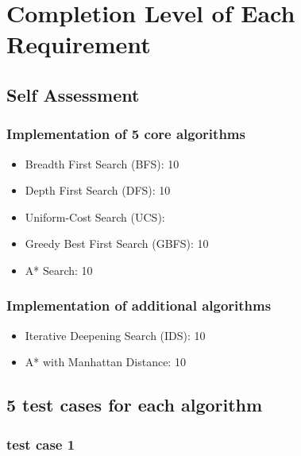 \section{Completion Level of Each Requirement}
\subsection{Self Assessment}
\subsubsection{Implementation of 5 core algorithms}
\begin{itemize}
    \item Breadth First Search (BFS): 10
    \item Depth First Search (DFS): 10
    \item Uniform-Cost Search (UCS): 
    \item Greedy Best First Search (GBFS): 10
    \item A* Search: 10
\end{itemize}
\subsubsection{Implementation of additional algorithms}
\begin{itemize}
    \item Iterative Deepening Search (IDS): 10
    \item A* with Manhattan Distance: 10
\end{itemize}
\subsection{5 test cases for each algorithm}
\subsubsection{test case 1}

\pagebreak